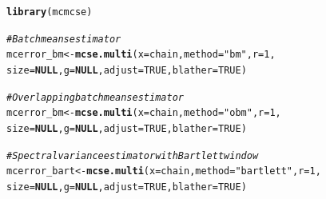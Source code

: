 \documentclass[11pt]{article}\usepackage[]{graphicx}\usepackage[]{color}
\makeatletter
\newcommand{\hlnum}[1]{\textcolor[rgb]{0.686,0.059,0.569}{#1}}%
\newcommand{\hlstr}[1]{\textcolor[rgb]{0.192,0.494,0.8}{#1}}%
\newcommand{\hlcom}[1]{\textcolor[rgb]{0.678,0.584,0.686}{\textit{#1}}}%
\newcommand{\hlstd}[1]{\textcolor[rgb]{0.345,0.345,0.345}{#1}}%
\newcommand{\hlkwa}[1]{\textcolor[rgb]{0.161,0.373,0.58}{\textbf{#1}}}%
\newcommand{\hlkwb}[1]{\textcolor[rgb]{0.69,0.353,0.396}{#1}}%
\newcommand{\hlkwc}[1]{\textcolor[rgb]{0.333,0.667,0.333}{#1}}%
\newcommand{\hlkwd}[1]{\textcolor[rgb]{0.737,0.353,0.396}{\textbf{#1}}}%
\newenvironment{kframe}{%
 \def\at@end@of@kframe{}%
 \ifinner\ifhmode%
  \def\at@end@of@kframe{\end{minipage}}%
  \begin{minipage}{\columnwidth}%
 \fi\fi%
 \def\FrameCommand##1{\hskip\@totalleftmargin \hskip-\fboxsep
 \colorbox{shadecolor}{##1}\hskip-\fboxsep
     \hskip-\linewidth \hskip-\@totalleftmargin \hskip\columnwidth}%
 \MakeFramed {\advance\hsize-\width
   \@totalleftmargin\z@ \linewidth\hsize
   \@setminipage}}%
 {\par\unskip\endMakeFramed%
 \at@end@of@kframe}
\newenvironment{knitrout}{}{} %
\makeatother
\begin{document}
\begin{knitrout}
\color{fgcolor}\begin{kframe}
\begin{alltt}
\hlkwd{library}\hlstd{(mcmcse)}
\end{alltt}


{\ttfamily\noindent\itshape{}}\begin{alltt}
\hlcom{# Batch means estimator}
\hlstd{mcerror_bm} \hlkwb{<-} \hlkwd{mcse.multi}\hlstd{(}\hlkwc{x} \hlstd{= chain,} \hlkwc{method} \hlstd{=}  \hlstr{"bm"}\hlstd{,} \hlkwc{r} \hlstd{=} \hlnum{1}\hlstd{,}
        \hlkwc{size} \hlstd{=} \hlkwa{NULL}\hlstd{,} \hlkwc{g} \hlstd{=} \hlkwa{NULL}\hlstd{,} \hlkwc{adjust} \hlstd{=} \hlnum{TRUE}\hlstd{,} \hlkwc{blather} \hlstd{=} \hlnum{TRUE}\hlstd{)}

\hlcom{# Overlapping batch means estimator}
\hlstd{mcerror_bm} \hlkwb{<-} \hlkwd{mcse.multi}\hlstd{(}\hlkwc{x} \hlstd{= chain,} \hlkwc{method} \hlstd{=}  \hlstr{"obm"}\hlstd{,} \hlkwc{r} \hlstd{=} \hlnum{1}\hlstd{,}
        \hlkwc{size} \hlstd{=} \hlkwa{NULL}\hlstd{,} \hlkwc{g} \hlstd{=} \hlkwa{NULL}\hlstd{,} \hlkwc{adjust} \hlstd{=} \hlnum{TRUE}\hlstd{,} \hlkwc{blather} \hlstd{=} \hlnum{TRUE}\hlstd{)}

\hlcom{# Spectral variance estimator with Bartlett window}
\hlstd{mcerror_bart} \hlkwb{<-} \hlkwd{mcse.multi}\hlstd{(}\hlkwc{x} \hlstd{= chain,} \hlkwc{method} \hlstd{=}  \hlstr{"bartlett"}\hlstd{,} \hlkwc{r} \hlstd{=} \hlnum{1}\hlstd{,}
        \hlkwc{size} \hlstd{=} \hlkwa{NULL}\hlstd{,} \hlkwc{g} \hlstd{=} \hlkwa{NULL}\hlstd{,} \hlkwc{adjust} \hlstd{=} \hlnum{TRUE}\hlstd{,} \hlkwc{blather} \hlstd{=} \hlnum{TRUE}\hlstd{)}


\end{alltt}
\end{kframe}
\end{knitrout}
\end{document}

